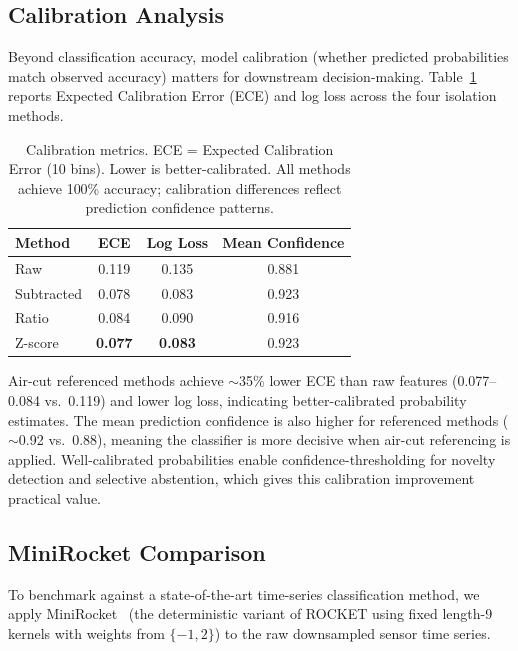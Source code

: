 \subsection{Calibration Analysis}

Beyond classification accuracy, model calibration (whether predicted probabilities match observed accuracy) matters for downstream decision-making. Table~\ref{tab:calibration} reports Expected Calibration Error (ECE) and log loss across the four isolation methods.

\begin{table}[H]
\caption{Calibration metrics. ECE = Expected Calibration Error (10 bins). Lower is better-calibrated. All methods achieve 100\% accuracy; calibration differences reflect prediction confidence patterns.}\label{tab:calibration}
\centering
\begin{tabular}{lccc}
\toprule
\textbf{Method} & \textbf{ECE} & \textbf{Log Loss} & \textbf{Mean Confidence} \\
\midrule
Raw        & 0.119 & 0.135 & 0.881 \\
Subtracted & 0.078 & 0.083 & 0.923 \\
Ratio      & 0.084 & 0.090 & 0.916 \\
Z-score    & \textbf{0.077} & \textbf{0.083} & 0.923 \\
\bottomrule
\end{tabular}
\end{table}

Air-cut referenced methods achieve $\sim$35\% lower ECE than raw features (0.077--0.084 vs.\ 0.119) and lower log loss, indicating better-calibrated probability estimates. The mean prediction confidence is also higher for referenced methods ($\sim$0.92 vs.\ 0.88), meaning the classifier is more decisive when air-cut referencing is applied. Well-calibrated probabilities enable confidence-thresholding for novelty detection and selective abstention, which gives this calibration improvement practical value.

\subsection{MiniRocket Comparison}

To benchmark against a state-of-the-art time-series classification method, we apply MiniRocket~\cite{dempster2020rocket} (the deterministic variant of ROCKET using fixed length-9 kernels with weights from $\{-1, 2\}$) to the raw downsampled sensor time series.

